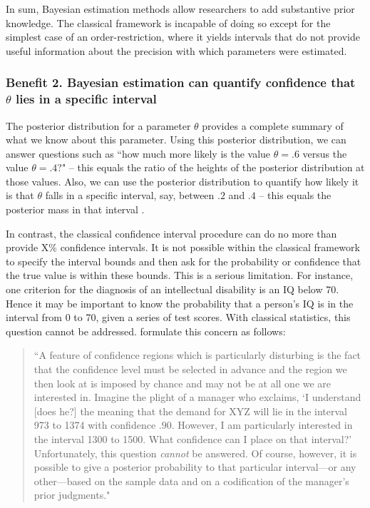In sum, Bayesian estimation methods allow researchers to add substantive prior knowledge. The classical framework is incapable of doing so except for the simplest case of an order-restriction, where it yields intervals that do not provide useful information about the precision with which parameters were estimated.

\subsubsection{Benefit 2. Bayesian estimation can quantify confidence that $\theta$ lies in a specific interval}
The posterior distribution for a parameter $\theta$ provides a complete summary of what we know about this parameter. Using this posterior distribution, we can answer questions such as ``how much more likely is the value $\theta = .6$ versus the value $\theta = .4$?" -- this equals the ratio of the heights of the posterior distribution at those values. Also, we can use the posterior distribution to quantify how likely it is that $\theta$ falls in a specific interval, say, between $.2$ and $.4$ -- this equals the posterior mass in that interval \cite{WagenmakersEtAl2016CD}.

In contrast, the classical confidence interval procedure can do no more than provide X\% confidence intervals. It is not possible within the classical framework to specify the interval bounds and then ask for the probability or confidence that the true value is within these bounds. This is a serious limitation. For instance, one criterion for the diagnosis of an intellectual disability is an IQ below 70. Hence it may be important to know the probability that a person's IQ is in the interval from 0 to 70, given a series of test scores. With classical statistics, this question cannot be addressed.  formulate this concern as follows:
\begin{quotation}
``A feature of confidence regions which is particularly disturbing is the fact that the confidence level must be selected in advance and the region we then look at is imposed by chance and may not be at all one we are interested in. Imagine the plight of a manager who exclaims, `I understand [does he?] the meaning that the demand for XYZ will lie in the interval 973 to 1374 with confidence $.90$. However, I am particularly interested in the interval 1300 to 1500. What confidence can I place on that interval?' Unfortunately, this question \emph{cannot} be answered. Of course, however, it is possible to give a posterior probability to that particular interval---or any other---based on the sample data and on a codification of the manager's prior judgments."
\end{quotation}

